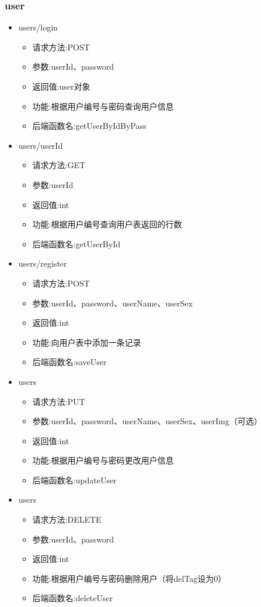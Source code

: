 \subsubsection*{user}
\begin{itemize}
\item users/login
\begin{itemize}
    \item 请求方法:POST
    \item 参数:userId、password
    \item 返回值:user对象
    \item 功能:根据用户编号与密码查询用户信息
    \item 后端函数名:getUserByIdByPass
\end{itemize}

\item users/{userId}
\begin{itemize}
    \item 请求方法:GET
    \item 参数:userId
    \item 返回值:int
    \item 功能:根据用户编号查询用户表返回的行数
    \item 后端函数名:getUserById
\end{itemize}

\item users/register
\begin{itemize}
    \item 请求方法:POST
    \item 参数:userId、password、userName、userSex
    \item 返回值:int
    \item 功能:向用户表中添加一条记录
    \item 后端函数名:saveUser
\end{itemize}

\item users
\begin{itemize}
    \item 请求方法:PUT
    \item 参数:userId、password、userName、userSex、userImg（可选）
    \item 返回值:int
    \item 功能:根据用户编号与密码更改用户信息
    \item 后端函数名:updateUser
\end{itemize}

\item users
\begin{itemize}
    \item 请求方法:DELETE
    \item 参数:userId、password
    \item 返回值:int
    \item 功能:根据用户编号与密码删除用户（将delTag设为0）
    \item 后端函数名:deleteUser
\end{itemize}
\end{itemize}


